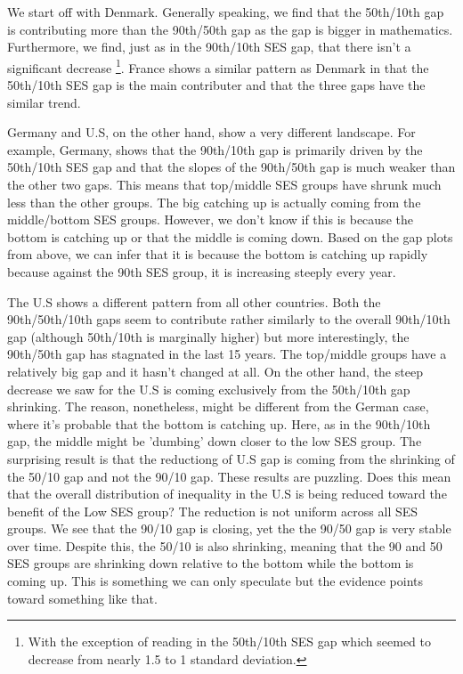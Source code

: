 \documentclass[11pt, a4paper]{article}\usepackage[]{graphicx}\usepackage[]{color}
\begin{document}

We start off with Denmark. Generally speaking, we find that the 50th/10th gap is contributing more than the 90th/50th gap as the gap is bigger in mathematics. Furthermore, we find, just as in the 90th/10th SES gap, that there isn't a significant decrease \footnote{With the exception of reading in the 50th/10th SES gap which seemed to decrease from nearly 1.5 to 1 standard deviation.}. France shows a similar pattern as Denmark in that the 50th/10th SES gap is the main contributer and that the three gaps have the similar trend. 

Germany and U.S, on the other hand, show a very different landscape. For example, Germany, shows that the 90th/10th gap is primarily driven by the 50th/10th SES gap and that the slopes of the 90th/50th gap is much weaker than the other two gaps. This means that top/middle SES groups have shrunk much less than the other groups. The big catching up is actually coming from the middle/bottom SES groups. However, we don't know if this is because the bottom is catching up or that the middle is coming down. Based on the gap plots from above, we can infer that it is because the bottom is catching up rapidly because against the 90th SES group, it is increasing steeply every year.

The U.S shows a different pattern from all other countries. Both the 90th/50th/10th gaps seem to contribute rather similarly to the overall 90th/10th gap (although 50th/10th is marginally higher) but more interestingly, the 90th/50th gap has stagnated in the last 15 years. The top/middle groups have a relatively big gap and it hasn't changed at all. On the other hand, the steep decrease we saw for the U.S is coming exclusively from the 50th/10th gap shrinking. The reason, nonetheless, might be different from the German case, where it's probable that the bottom is catching up. Here, as in the 90th/10th gap, the middle might be 'dumbing' down closer to the low SES group. The surprising result is that the reductiong of U.S gap is coming from the shrinking of the 50/10 gap and not the 90/10 gap. These results are puzzling. Does this mean that the overall distribution of inequality in the U.S is being reduced toward the benefit of the Low SES group? The reduction is not uniform across all SES groups. We see that the 90/10 gap is closing, yet the the 90/50 gap is very stable over time. Despite this, the 50/10 is also shrinking, meaning that the 90 and 50 SES groups are shrinking down relative to the bottom while the bottom is coming up. This is something we can only speculate but the evidence points toward something like that.
\end{document}
